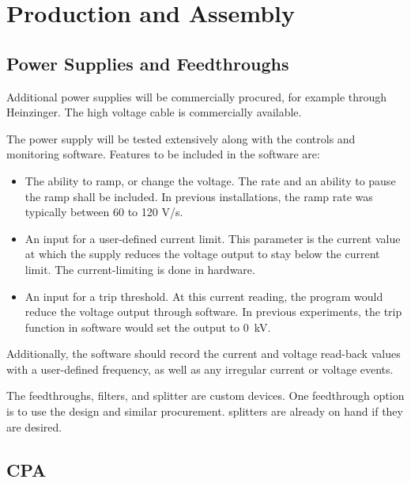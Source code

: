 \section{Production and Assembly}
\label{sec:fdsp-hv-prod-assy}

\subsection{Power Supplies and Feedthroughs}
\label{sec:fdsp-hv-supplies-feedthroughs}

Additional power supplies will be commercially procured, for example through Heinzinger. The high voltage cable is commercially available.

The power supply will be tested extensively along with the controls and monitoring software.  Features to be included in the software are:
\begin{itemize}
\item The ability to ramp, or change the voltage.  The rate and an ability to pause the ramp shall be included.  In previous installations, the ramp rate was typically between 60 to 120 V/s.
\item An input for a user-defined current limit.  This parameter is the current value at which the supply reduces the voltage output to stay below the current limit.  The current-limiting is done in hardware.
\item An input for a trip threshold.  At this current reading, the program would reduce the voltage output through software.  In previous experiments, the trip function in software would set the output to \SI{0}{kV}.
\end{itemize}
\noindent Additionally, the software should record the current and voltage read-back values with a user-defined frequency, as well as any irregular current or voltage events.

The  feedthroughs, filters, and splitter are custom devices.  One feedthrough option is to use the  design and similar procurement.   splitters are already on hand if they are desired.

\subsection{CPA}
\label{sec:fdsp-hv-prod-cpa}

